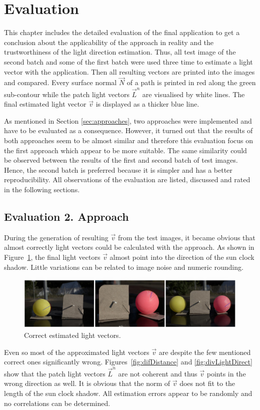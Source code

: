 \section{Evaluation} \label{sec:Evaluation}

This chapter includes the detailed evaluation of the final application to get a conclusion about the applicability of the approach in reality and the trustworthiness of the light direction estimation. Thus, all test image of the second batch and some of the first batch were used three time to estimate a light vector with the application. Then all resulting vectors are printed into the images and compared. Every surface normal $\vec{N}$ of a path is printed in red along the green sub-contour while the patch light vectors $\vec{L}^n$ are visualised by white lines. The final estimated light vector $\vec{v}$ is displayed as a thicker blue line. 

As mentioned in Section \ref{sec:approaches}, two approaches were implemented and have to be evaluated as a consequence. However, it turned out that the results of both approaches seem to be almost similar and therefore this evaluation focus on the first approach which appear to be more suitable. The same similarity could be observed between the results of the first and second batch of test images. Hence, the second batch is preferred because it is simpler and has a better reproducibility. All observations of the evaluation are listed, discussed and rated in the following sections.
\subsection{Evaluation 2. Approach}
During the generation of resulting $\vec{v}$ from the test images, it became obvious that almost correctly light vectors could be calculated with the approach. As shown in Figure~\ref{fig:goodRes}, the final light vectors $\vec{v}$ almost point into the direction of the sun clock shadow. Little variations can be related to image noise and numeric rounding.
\begin{figure}[H] 
	\center 
	\includegraphics[width=\linewidth]{Images/Korrekte_Lightvectoren.jpg}	
	\caption[Bildunterschrift]{Correct estimated light vectors.}	
		\label{fig:goodRes}	
\end{figure}
Even so most of the approximated light vectors $\vec{v}$ are despite the few mentioned correct ones significantly wrong. Figures~\ref{fig:difDistance} and \ref{fig:divLightDirect} show that the patch light vectors $\vec{L}^n$ are not coherent and thus $\vec{v}$ points in the wrong direction as well. It is obvious that the norm of $\vec{v}$ does not fit to the length of the sun clock shadow. All estimation errors appear to be randomly and no correlations can be determined. 

